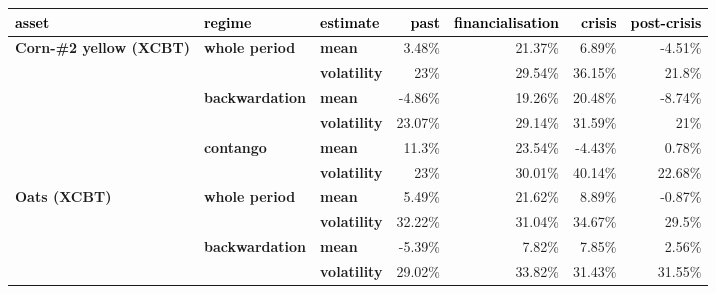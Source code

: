 \documentclass[
  authoryear,
  preprint,
  3p]{elsarticle}
\begin{document}
\begin{longtable}[t]{>{}l>{}l>{}l>{}r>{}r>{}r>{}r}
\toprule
\textcolor{black}{\textbf{asset}} & \textcolor{black}{\textbf{regime}} & \textcolor{black}{\textbf{estimate}} & \textcolor{black}{\textbf{past}} & \textcolor{black}{\textbf{financialisation}} & \textcolor{black}{\textbf{crisis}} & \textcolor{black}{\textbf{post-crisis}}\\
\midrule
\textbf{Corn-\#2 yellow (XCBT)} & \textbf{whole period} & \textbf{mean} & \textcolor[HTML]{4285f4}{3.48\%} & \textcolor[HTML]{4285f4}{21.37\%} & \textcolor[HTML]{4285f4}{6.89\%} & \textcolor[HTML]{4285f4}{-4.51\%}\\
\textbf{} & \textbf{} & \textbf{volatility} & \textcolor[HTML]{4285f4}{23\%} & \textcolor[HTML]{4285f4}{29.54\%} & \textcolor[HTML]{4285f4}{36.15\%} & \textcolor[HTML]{4285f4}{21.8\%}\\
\textbf{} & \textbf{backwardation} & \textbf{mean} & \textcolor[HTML]{4285f4}{-4.86\%} & \textcolor[HTML]{4285f4}{19.26\%} & \textcolor[HTML]{4285f4}{20.48\%} & \textcolor[HTML]{4285f4}{-8.74\%}\\
\textbf{} & \textbf{} & \textbf{volatility} & \textcolor[HTML]{4285f4}{23.07\%} & \textcolor[HTML]{4285f4}{29.14\%} & \textcolor[HTML]{4285f4}{31.59\%} & \textcolor[HTML]{4285f4}{21\%}\\
\textbf{} & \textbf{contango} & \textbf{mean} & \textcolor[HTML]{4285f4}{11.3\%} & \textcolor[HTML]{4285f4}{23.54\%} & \textcolor[HTML]{4285f4}{-4.43\%} & \textcolor[HTML]{4285f4}{0.78\%}\\
\addlinespace
\textbf{} & \textbf{} & \textbf{volatility} & \textcolor[HTML]{4285f4}{23\%} & \textcolor[HTML]{4285f4}{30.01\%} & \textcolor[HTML]{4285f4}{40.14\%} & \textcolor[HTML]{4285f4}{22.68\%}\\
\textbf{Oats (XCBT)} & \textbf{whole period} & \textbf{mean} & \textcolor[HTML]{4285f4}{5.49\%} & \textcolor[HTML]{4285f4}{21.62\%} & \textcolor[HTML]{4285f4}{8.89\%} & \textcolor[HTML]{4285f4}{-0.87\%}\\
\textbf{} & \textbf{} & \textbf{volatility} & \textcolor[HTML]{4285f4}{32.22\%} & \textcolor[HTML]{4285f4}{31.04\%} & \textcolor[HTML]{4285f4}{34.67\%} & \textcolor[HTML]{4285f4}{29.5\%}\\
\textbf{} & \textbf{backwardation} & \textbf{mean} & \textcolor[HTML]{4285f4}{-5.39\%} & \textcolor[HTML]{4285f4}{7.82\%} & \textcolor[HTML]{4285f4}{7.85\%} & \textcolor[HTML]{4285f4}{2.56\%}\\
\textbf{} & \textbf{} & \textbf{volatility} & \textcolor[HTML]{4285f4}{29.02\%} & \textcolor[HTML]{4285f4}{33.82\%} & \textcolor[HTML]{4285f4}{31.43\%} & \textcolor[HTML]{4285f4}{31.55\%}\\

\end{longtable}
\end{document}
